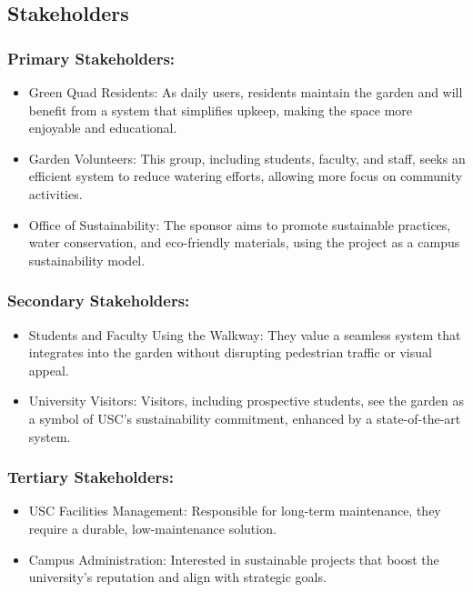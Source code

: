 \documentclass[12pt]{report}
\begin{document}
\subsection{Stakeholders}
\subsubsection{Primary Stakeholders:}
\begin{itemize}
    \item Green Quad Residents: As daily users, residents maintain the garden and will benefit from a system that simplifies upkeep, making the space more enjoyable and educational.
    \item Garden Volunteers: This group, including students, faculty, and staff, seeks an efficient system to reduce watering efforts, allowing more focus on community activities.
    \item Office of Sustainability: The sponsor aims to promote sustainable practices, water conservation, and eco-friendly materials, using the project as a campus sustainability model.
\end{itemize}

\subsubsection{Secondary Stakeholders:}
\begin{itemize}
    \item Students and Faculty Using the Walkway: They value a seamless system that integrates into the garden without disrupting pedestrian traffic or visual appeal.
    \item University Visitors: Visitors, including prospective students, see the garden as a symbol of USC’s sustainability commitment, enhanced by a state-of-the-art system.
\end{itemize}

\subsubsection{Tertiary Stakeholders:}
\begin{itemize}
    \item USC Facilities Management: Responsible for long-term maintenance, they require a durable, low-maintenance solution.
    \item Campus Administration: Interested in sustainable projects that boost the university’s reputation and align with strategic goals.
\end{itemize}
\end{document}
